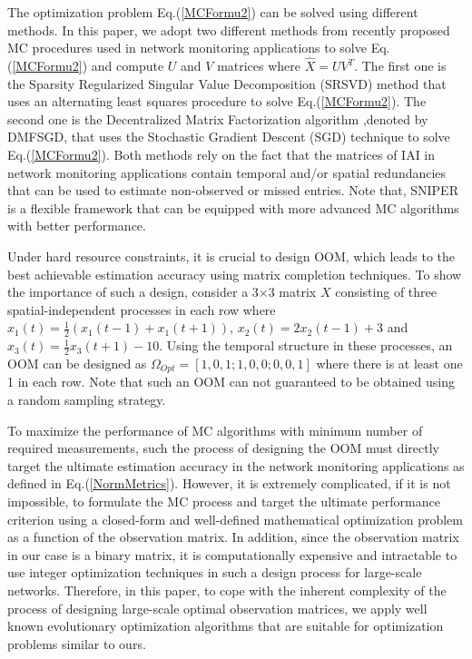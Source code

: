 The optimization problem Eq.(\ref{MCFormu2}) can be solved using different methods. In this paper, we adopt two different methods from recently proposed MC procedures used in network monitoring applications to solve Eq.(\ref{MCFormu2}) and compute $U$ and $V$ matrices where $\hat{X}=UV^{T}$. The first one is the Sparsity Regularized Singular Value Decomposition (SRSVD) method \cite{Roughan:2012} that uses an alternating least squares procedure to solve Eq.(\ref{MCFormu2}). The second one is the Decentralized Matrix Factorization algorithm \cite{YLiao:2011},denoted by DMFSGD, that uses the Stochastic Gradient Descent (SGD) technique to solve Eq.(\ref{MCFormu2}). Both methods rely on the fact that the matrices of IAI in network monitoring applications contain temporal and/or spatial redundancies that can be used to estimate non-observed or missed entries. Note that, SNIPER is a flexible framework that can be equipped with more advanced MC algorithms with better performance.  

Under hard resource constraints, it is crucial to design OOM, which leads to the best achievable estimation accuracy using matrix completion techniques. To show the importance of such a design, consider a 3$\times$3 matrix $X$ consisting of three spatial-independent processes in each row where $x_{1}(t)=\frac{1}{2}(x_{1}(t-1)+x_{1}(t+1))$, $x_{2}(t)=2x_{2}(t-1)+3$ and $x_{3}(t)=\frac{1}{2} x_{3}(t+1)-10$. Using the temporal structure in these processes, an OOM can be designed as $\Omega_{Opt}=[1, 0, 1; 1, 0, 0; 0, 0, 1]$ where there is at least one 1 in each row. Note that such an OOM can not guaranteed to be obtained using a random sampling strategy.

To maximize the performance of MC algorithms with minimum number of required measurements, such the process of designing the OOM must directly target the ultimate estimation accuracy in the network monitoring applications as defined in Eq.(\ref{NormMetrics}). However, it is extremely complicated, if it is not impossible, to formulate the MC process and target the ultimate performance criterion using a closed-form and well-defined mathematical optimization problem as a function of the observation matrix. In addition, since the observation matrix in our case is a binary matrix, it is computationally expensive and intractable to use integer optimization techniques in such a design process for large-scale networks. Therefore, in this paper, to cope with the inherent complexity of the process of designing large-scale optimal observation matrices, we apply well known evolutionary optimization algorithms that are suitable for optimization problems similar to ours.

